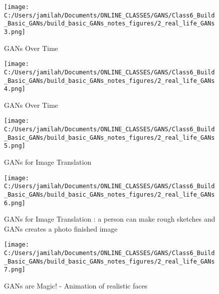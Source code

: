 \documentclass[11pt, onecolumn]{article}
\begin{document}
\begin{figure}[htp]
\begin{center}
\texttt{[image: C:/Users/jamilah/Documents/ONLINE\_CLASSES/GANS/Class6\_Build\_Basic\_GANs/build\_basic\_GANs\_notes\_figures/2\_real\_life\_GANs3.png]}
\end{center}
\caption{GANs Over Time}
\label{2_real_life_GANs3}
\end{figure}

\begin{figure}[htp]
\begin{center}
\texttt{[image: C:/Users/jamilah/Documents/ONLINE\_CLASSES/GANS/Class6\_Build\_Basic\_GANs/build\_basic\_GANs\_notes\_figures/2\_real\_life\_GANs4.png]}
\end{center}
\caption{GANs Over Time}
\label{2_real_life_GANs4}
\end{figure}

\begin{figure}[htp]
\begin{center}
\texttt{[image: C:/Users/jamilah/Documents/ONLINE\_CLASSES/GANS/Class6\_Build\_Basic\_GANs/build\_basic\_GANs\_notes\_figures/2\_real\_life\_GANs5.png]}
\end{center}
\caption{GANs for Image Translation}
\label{2_real_life_GANs5}
\end{figure}

\begin{figure}[htp]
\begin{center}
\texttt{[image: C:/Users/jamilah/Documents/ONLINE\_CLASSES/GANS/Class6\_Build\_Basic\_GANs/build\_basic\_GANs\_notes\_figures/2\_real\_life\_GANs6.png]}
\end{center}
\caption{GANs for Image Translation : a person can make rough sketches and GANs creates a photo finished image}
\label{2_real_life_GANs6}
\end{figure}

\begin{figure}[htp]
\begin{center}
\texttt{[image: C:/Users/jamilah/Documents/ONLINE\_CLASSES/GANS/Class6\_Build\_Basic\_GANs/build\_basic\_GANs\_notes\_figures/2\_real\_life\_GANs7.png]}
\end{center}
\caption{GANs are Magic! - Animation of realistic faces}
\label{2_real_life_GANs7}
\end{figure}
\end{document}
